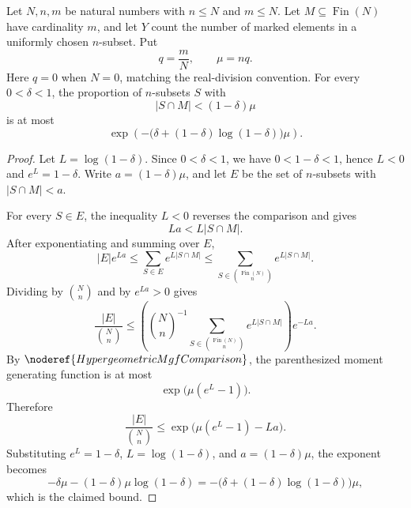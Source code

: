 \begin{helper}
Let \(N,n,m\) be natural numbers with \(n\le N\) and \(m\le N\).  Let
\(M\subseteq \operatorname{Fin}(N)\) have cardinality \(m\), and let \(Y\)
count the number of marked elements in a uniformly chosen \(n\)-subset.  Put
\[
q=\frac{m}{N},\qquad \mu=nq.
\]
Here \(q=0\) when \(N=0\), matching the real-division convention.
For every \(0<\delta<1\), the proportion of \(n\)-subsets \(S\) with
\[
|S\cap M|<(1-\delta)\mu
\]
is at most
\[
\exp\!\left(-\bigl(\delta+(1-\delta)\log(1-\delta)\bigr)\mu\right).
\]
\end{helper}
\begin{proof}
Let \(L=\log(1-\delta)\).  Since \(0<\delta<1\), we have
\(0<1-\delta<1\), hence \(L<0\) and \(e^L=1-\delta\).  Write
\(a=(1-\delta)\mu\), and let \(E\) be the set of \(n\)-subsets with
\(|S\cap M|<a\).

For every \(S\in E\), the inequality \(L<0\) reverses the comparison and gives
\[
L a < L|S\cap M|.
\]
After exponentiating and summing over \(E\),
\[
|E|e^{La}
\le \sum_{S\in E} e^{L|S\cap M|}
\le \sum_{S\in \binom{\operatorname{Fin}(N)}{n}} e^{L|S\cap M|}.
\]
Dividing by \(\binom Nn\) and by \(e^{La}>0\) gives
\[
\frac{|E|}{\binom Nn}
\le
\left(\binom{N}{n}^{-1}
\sum_{S\in \binom{\operatorname{Fin}(N)}{n}} e^{L|S\cap M|}\right)
e^{-La}.
\]
By \(\noderef{HypergeometricMgfComparison}\), the parenthesized moment
generating function is at most
\[
\exp\bigl(\mu(e^L-1)\bigr).
\]
Therefore
\[
\frac{|E|}{\binom Nn}
\le
\exp\bigl(\mu(e^L-1)-La\bigr).
\]
Substituting \(e^L=1-\delta\), \(L=\log(1-\delta)\), and
\(a=(1-\delta)\mu\), the exponent becomes
\[
-\delta\mu-(1-\delta)\mu\log(1-\delta)
=-\bigl(\delta+(1-\delta)\log(1-\delta)\bigr)\mu,
\]
which is the claimed bound.
\end{proof}
